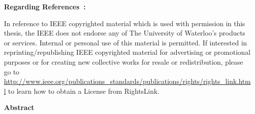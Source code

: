\begingroup
\small              %
\noindent
\textbf{Regarding References~\cite{Badakhshan2023Outline,Badakhshan2025AuroraZupply}:}

\noindent
In reference to IEEE copyrighted material which is used with permission in this thesis, the IEEE does not endorse any of The University of Waterloo's products or services. Internal or personal use of this material is permitted. If interested in reprinting/republishing IEEE copyrighted material for advertising or promotional purposes or for creating new collective works for resale or redistribution, please go to \url{http://www.ieee.org/publications\_standards/publications/rights/rights\_link.html} to learn how to obtain a License from RightsLink. 
\endgroup

%
\cleardoublepage
{}    %
\begin{center}\textbf{Abstract}\end{center}

